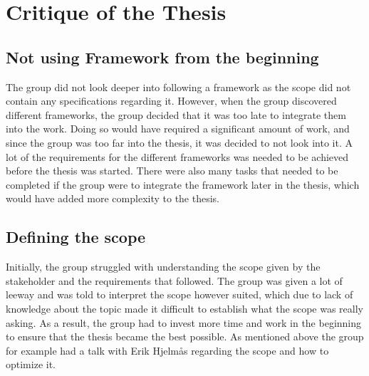 \section{Critique of the Thesis}

\subsection{Not using Framework from the beginning}
The group did not look deeper into following a framework as the scope did not contain any specifications regarding it. However, when the group discovered different frameworks, the group decided that it was too late to integrate them into the work. Doing so would have required a significant amount of work, and since the group was too far into the thesis, it was decided to not look into it. A lot of the requirements for the different frameworks was needed to be achieved before the thesis was started. There were also many tasks that needed to be completed if the group were to integrate the framework later in the thesis, which would have added more complexity to the thesis. 

\subsection{Defining the scope}
Initially, the group struggled with understanding the scope given by the stakeholder and the requirements that followed. The group was given a lot of leeway and was told to interpret the scope however suited, which due to lack of knowledge about the topic made it difficult to establish what the scope was really asking. As a result, the group had to invest more time and work in the beginning to ensure that the thesis became the best possible. As mentioned above the group for example had a talk with Erik Hjelmås regarding the scope and how to optimize it. 

